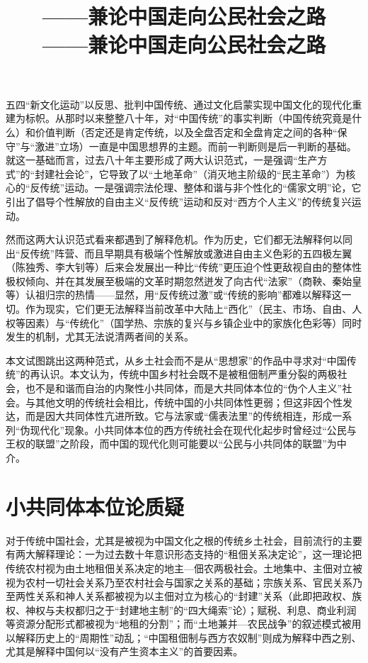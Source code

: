 \documentclass[a4paper,12pt,punct=kaiming]{ctexart}
\title{\bfseries\titleContent \\[1em] \large\normalfont——兼论中国走向公民社会之路}
\title{\Large\bfseries\titleContent \\[1em] \small\normalfont——兼论中国走向公民社会之路}
\author{\authorContent}
\date{}
\begin{document}
\maketitle


五四“新文化运动”以反思、批判中国传统、通过文化启蒙实现中国文化的现代化重建为标帜。从那时以来整整八十年，对“中国传统”的事实判断（中国传统究竟是什么）和价值判断（否定还是肯定传统，以及全盘否定和全盘肯定之间的各种“保守”与“激进”立场）一直是中国思想界的主题。而前一判断则是后一判断的基础。就这一基础而言，过去八十年主要形成了两大认识范式，一是强调“生产方式”的“封建社会论”，它导致了以“土地革命”（消灭地主阶级的“民主革命”）为核心的“反传统”运动。一是强调宗法伦理、整体和谐与非个性化的“儒家文明”论，它引出了倡导个性解放的自由主义“反传统”运动和反对“西方个人主义”的传统复兴运动。

然而这两大认识范式看来都遇到了解释危机。作为历史，它们都无法解释何以同出“反传统”阵营、而且早期具有极端个性解放或激进自由主义色彩的五四极左翼（陈独秀、李大钊等）后来会发展出一种比“传统”更压迫个性更敌视自由的整体性极权倾向、并在其发展至极端的文革时期忽然迸发了向古代“法家”（商鞅、秦始皇等）认祖归宗的热情——显然，用“反传统过激”或“传统的影响”都难以解释这一切。作为现实，它们更无法解释当前改革中大陆上“西化”（民主、市场、自由、人权等因素）与“传统化”（国学热、宗族的复兴与乡镇企业中的家族化色彩等）同时发生的机制，尤其无法说清两者间的关系。

本文试图跳出这两种范式，从乡土社会而不是从“思想家”的作品中寻求对“中国传统”的再认识。本文认为，传统中国乡村社会既不是被租佃制严重分裂的两极社会，也不是和谐而自治的内聚性小共同体，而是大共同体本位的“伪个人主义”社会。与其他文明的传统社会相比，传统中国的小共同体性更弱；但这非因个性发达，而是因大共同体性亢进所致。它与法家或“儒表法里”的传统相连，形成一系列“伪现代化”现象。小共同体本位的西方传统社会在现代化起步时曾经过“公民与王权的联盟”之阶段，而中国的现代化则可能要以“公民与小共同体的联盟”为中介。

\section*{小共同体本位论质疑}

对于传统中国社会，尤其是被视为中国文化之根的传统乡土社会，目前流行的主要有两大解释理论：一为过去数十年意识形态支持的“租佃关系决定论”，这一理论把传统农村视为由土地租佃关系决定的地主—佃农两极社会。土地集中、主佃对立被视为农村一切社会关系乃至农村社会与国家之关系的基础；宗族关系、官民关系乃至两性关系和神人关系都被视为以主佃对立为核心的“封建”关系（此即把政权、族权、神权与夫权都归之于“封建地主制”的“四大绳索”论）；赋税、利息、商业利润等资源分配形式都被视为“地租的分割”；而“土地兼并—农民战争”的叙述模式被用以解释历史上的“周期性”动乱；“中国租佃制与西方农奴制”则成为解释中西之别、尤其是解释中国何以“没有产生资本主义”的首要因素。
\end{document}
